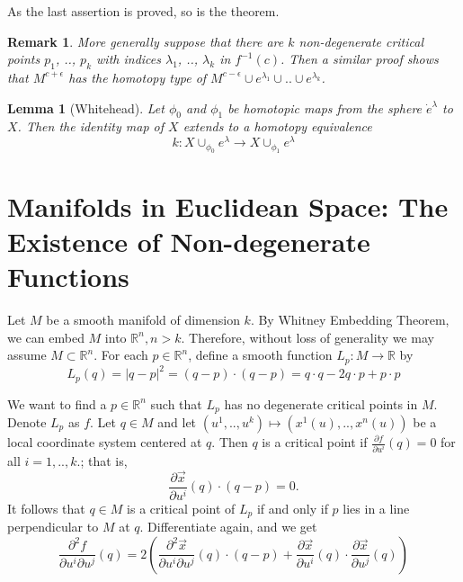 \documentclass[a4paper,11pt,reqno]{amsart}
\newtheorem{lem}[thm]{Lemma}
\newtheorem{rmk}[thm]{Remark}
\newcommand{\RR}{\mathbb{R}}      %
\newcommand{\vect}[1]{\vec{#1}}
\begin{document}
As the last assertion is proved, so is the theorem.

\begin{rmk}
  More generally suppose that there are $k$ non-degenerate critical points
  $p_1$, .., $p_k$ with indices $\lambda_1$, .., $\lambda_k$ in
  $f^{-1}(c)$. Then a similar proof shows that $M^{c+\epsilon}$ has the homotopy
  type of $M^{c-\epsilon}\cup e^{\lambda_1}\cup .. \cup e^{\lambda_k}$.
\end{rmk}

\begin{lem}[Whitehead]
  Let $\phi_0$ and $\phi_1$ be homotopic maps from the sphere $\dot{e}^\lambda$
  to $X$. Then the identity map of $X$ extends to a homotopy equivalence
  \begin{equation}
    k: X \cup_{\phi_0} e^\lambda \to X \cup_{\phi_1} e^\lambda
  \end{equation}
\end{lem}



\section{Manifolds in Euclidean Space: The Existence of Non-degenerate
  Functions}

Let $M$ be a smooth manifold of dimension $k$. By Whitney Embedding Theorem, we
can embed $M$ into $\RR^n, n > k$. Therefore, without loss of generality we may
assume $M \subset \RR^n$. For each $p \in \RR^n$, define a smooth function $L_p
: M \to \RR $ by
\begin{equation}
  L_p(q) = |q-p|^2 = (q-p) \cdot (q-p) = q\cdot q-2q \cdot p + p \cdot p
\end{equation}

We want to find a $p \in \RR^n$ such that $L_p$ has no degenerate critical
points in $M$. Denote $L_p$ as $f$. Let $q \in M$ and let $(u^1, .., u^k)
\mapsto (x^1(u), .., x^n(u))$ be a local coordinate system centered at $q$. Then $q$ is
a critical point if $\frac{\partial f}{\partial u^i}(q) = 0$ for all $i = 1, ..,
k.$; that is,
\begin{equation}
  \frac{\partial \vect{x}}{\partial u^i}(q) \cdot (q-p) = 0.
\end{equation}
It follows that $q \in M$ is a critical point of $L_p$ if and only if $p$ lies
in a line perpendicular to $M$ at $q$. Differentiate again, and we get
\begin{equation}
  \frac{\partial^2 f}{\partial u^i \partial u^j}(q) = 
  2\left(
    \frac{\partial^2 \vect{x}}{\partial u^i \partial u^j}(q) \cdot (q-p) +
    \frac{\partial \vect{x}}{\partial u^i}(q) \cdot \frac{\partial \vect{x}}{\partial u^j}(q)
  \right)
\end{equation}
\end{document}
